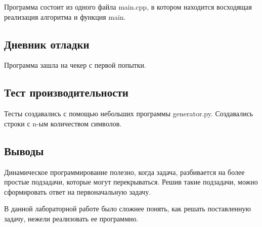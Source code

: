 \documentclass[12pt]{article}
\begin{document}
Программа состоит из одного файла main.cpp, в котором находится восходящая реализация алгоритма и функция main.
\subsection*{Дневник отладки}

Программа зашла на чекер с первой попытки.

\newpage

\subsection*{Тест производительности}

Тесты создавались с помощью небольших программы generator.py. Создавались строки с n-ым количеством символов.


\subsection*{Выводы}

Динамическое программирование полезно, когда задача, разбивается на более простые подзадачи, которые могут перекрываться. Решив такие подзадачи, можно сформировать ответ на первоначальную задачу.

В данной лабораторной работе было сложнее понять, как решать поставленную задачу, нежели реализовать ее программно.
\end{document}
